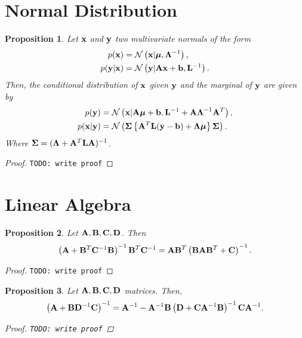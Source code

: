 \documentclass[11pt]{article}
\numberwithin{equation}{section}
\newcommand{\x}{{\bf x}}
\newcommand{\N}{\mathcal{N}}
\newtheorem{proposition}{Proposition}[section]
\begin{document}
\section{Normal Distribution}
\begin{proposition} \label{prop:multivariate-normal-combination}
	Let $\x$ and ${\bf y}$ two multivariate normals of the form
	\begin{align}
		p(\x) &= \N\left(\x \vert \boldsymbol\mu, \boldsymbol\Lambda^{-1}\right),\\
		p({\bf y} \vert \x ) &= \N\left({\bf y} \vert {\bf A}\x + {\bf b}, {\bf L}^{-1}\right).
	\end{align}
	Then, the conditional distribution of $\x$ given ${\bf y}$ and the marginal of ${\bf y}$ are given by
	\begin{align}
		p({\bf y}) &= \N\left(\x\vert {\bf A}\boldsymbol\mu + {\bf b}, {\bf L}^{-1} + {\bf A}\boldsymbol\Lambda^{-1}{\bf A}^T\right), \label{eq:normal-marginal}\\
		p(\x \vert {\bf y}) &= \N\left(\boldsymbol\Sigma\left\{{\bf A}^T {\bf L}({\bf y} - {\bf b})  + \boldsymbol\Lambda\boldsymbol\mu \right\} \boldsymbol\Sigma\right) \label{eq:normal-conditional}.
	\end{align}
	Where $\boldsymbol{\Sigma} = (\boldsymbol\Lambda + {\bf A}^T {\bf L} {\bf A})^{-1}$.
\end{proposition}

\begin{proof}
	\texttt{TODO: write proof}
\end{proof}

\section{Linear Algebra}

\begin{proposition} \label{prop:matrix-rewrite1}
	Let ${\bf A}, {\bf B}, {\bf C}, {\bf D}$. Then
	\begin{equation}
		\left({\bf A} + {\bf B}^T {\bf C}^{-1} {\bf B}\right)^{-1}{\bf B}^T {\bf C}^{-1} = {\bf A}{\bf B}^T\left({\bf B}{\bf A}{\bf B}^T + {\bf C}\right)^{-1}.
	\end{equation}
\end{proposition}

\begin{proof}
	\texttt{TODO: write proof}
\end{proof}

\begin{proposition} \label{prop:woodbury-identity}
	Let ${\bf A}, {\bf B}, {\bf C}, {\bf D}$ matrices. Then,
	\begin{equation}
		\left({\bf A} + {\bf B} {\bf D}^{-1}{\bf C}\right)^{-1} = {\bf A}^{-1} - {\bf A}^{-1}{\bf B}\left({\bf D} + {\bf C}{\bf A}^{-1}{\bf B}\right)^{-1}{\bf C}{\bf A}^{-1}.
	\end{equation}
	\begin{proof}
		\texttt{TODO: write proof}
	\end{proof}
\end{proposition}


\end{document}
